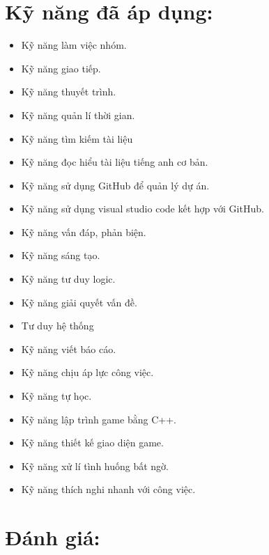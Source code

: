 \documentclass{article}
\begin{document}
\section{Kỹ năng đã áp dụng:}

\begin{itemize}
    \item Kỹ năng làm việc nhóm.
    \item Kỹ năng giao tiếp.
    \item Kỹ năng thuyết trình.
    \item Kỹ năng quản lí thời gian.
    \item Kỹ năng tìm kiếm tài liệu
    \item Kỹ năng đọc hiểu tài liệu tiếng anh cơ bản.
    \item Kỹ năng sử dụng GitHub để quản lý dự án.
    \item Kỹ năng sử dụng visual studio code kết hợp với GitHub.
    \item Kỹ năng vấn đáp, phản biện.
    \item Kỹ năng sáng tạo.
    \item Kỹ năng tư duy logic.
    \item Kỹ năng giải quyết vấn đề.
    \item Tư duy hệ thống
    \item Kỹ năng viết báo cáo.
    \item Kỹ năng chịu áp lực công việc.
    \item Kỹ năng tự học.
    \item Kỹ năng lập trình game bằng C++.
    \item Kỹ năng thiết kế giao diện game.
    \item Kỹ năng xử lí tình huống bất ngờ.
    \item Kỹ năng thích nghi nhanh với công việc.
    
\end{itemize}

\newpage
\section{Đánh giá:}
\end{document}
